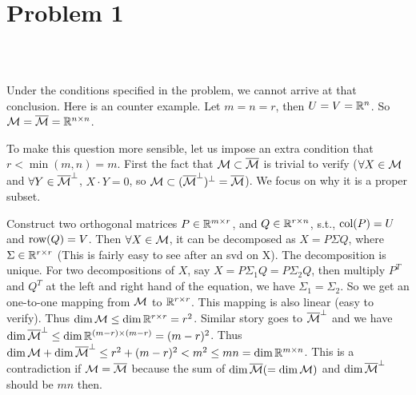 \section{Problem 1}~\label{sec:prob1}

\subsection{} %

Under the conditions specified in the problem,
we cannot arrive at that conclusion.
Here is an counter example.
Let $m=n=r$, then $U=V={\mathbb{R}}^n$.
So ${\mathcal{M}}={\overline{{\mathcal{M}}}}={\mathbb{R}}^{n\times n}$.

To make this question more sensible,
let us impose an extra condition that
$r<\min(m,n)=m$.
First the fact that ${\mathcal{M}} \subset {\overline{{\mathcal{M}}}}$ is trivial to verify
($\forall X \in {\mathcal{M}}$ and $\forall Y \in {\overline{{\mathcal{M}}}}^\perp$, $X\cdot Y=0$,
so ${\mathcal{M}} \subset ({\overline{{\mathcal{M}}}}^\perp)^\perp={\overline{{\mathcal{M}}}}$).
We focus on why it is a proper subset.

Construct two orthogonal matrices $P\in{\mathbb{R}}^{m\times r}$,
and $Q\in {\mathbb{R}}^{r\times n}$, s.t.,
${\text{col}}(P)=U$ and ${\text{row}}(Q)=V$.
Then $\forall X\in{\mathcal{M}}$, it can be decomposed as
$X=P\Sigma Q$, where $\Sigma\in{\mathbb{R}}^{r\times r}$
(This is fairly easy to see after an svd on X).
The decomposition is unique.
For two decompositions of $X$,
say $X=P\Sigma_1 Q=P\Sigma_2 Q$,
then multiply $P^T$ and $Q^T$ at the left and right hand of the equation,
we have $\Sigma_1=\Sigma_2$.
So we get an one-to-one mapping from ${\mathcal{M}}$ to ${\mathbb{R}}^{r\times r}$.
This mapping is also linear (easy to verify).
Thus $\dim {\mathcal{M}} \le \dim {\mathbb{R}}^{r\times r} = r^2$.
Similar story goes to ${\overline{{\mathcal{M}}}}^\perp$ and we have
$\dim {\overline{{\mathcal{M}}}}^\perp \le \dim {\mathbb{R}}^{(m-r)\times(m-r)} = (m-r)^2$.
Thus $\dim {\mathcal{M}} + \dim {\overline{{\mathcal{M}}}}^\perp \le r^2 + (m-r)^2 < m^2 \le mn = \dim {\mathbb{R}}^{m\times n}$.
This is a contradiction if ${\mathcal{M}}={\overline{{\mathcal{M}}}}$ because
the sum of $\dim {\overline{{\mathcal{M}}}}(=\dim {\mathcal{M}})$ and $\dim {\overline{{\mathcal{M}}}}^\perp$ should be $mn$ then.

\subsection{} %

